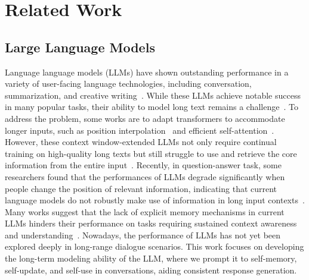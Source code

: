 \documentclass[authoryear,preprint,review,12pt]{elsarticle}
\begin{document}
\section{Related Work}
\subsection{Large Language Models}
Language language models (LLMs) have shown outstanding performance in a variety of user-facing language technologies, including conversation, summarization, and creative writing~\citep{GPT4OpenAI,Shuster2022BlenderBot3A, rubin2023long}. While these LLMs achieve notable success in many popular tasks, their ability to model long text remains a challenge~\citep{An2023LEvalIS}. To address the problem, some works are to adapt transformers to accommodate longer inputs, such as position interpolation~\citep{Chen2023ExtendingCW} and efficient self-attention~\citep{Beltagy2020LongformerTL, Chen2023LongLoRAEF}. However, these context window-extended LLMs not only require continual training on high-quality long texts but still struggle to use and retrieve the core information from the entire input~\citep{Liu2023LostIT}. Recently, in question-answer task, some researchers found that the performances of LLMs degrade significantly when people change the position of relevant information, indicating that current language models do not robustly make use of information in long input contexts~\citep{Liu2023LostIT,Li2023LooGLECL}. Many works suggest that the lack of explicit memory mechanisms in current LLMs hinders their performance on tasks requiring sustained context awareness and understanding~\citep{chen2024compress}. 
Nowadays, the performance of LLMs has not yet been explored deeply in long-range dialogue scenarios. This work focuses on developing the long-term modeling ability of the LLM, where we prompt it to self-memory, self-update, and self-use in conversations, aiding consistent response generation.
\end{document}
